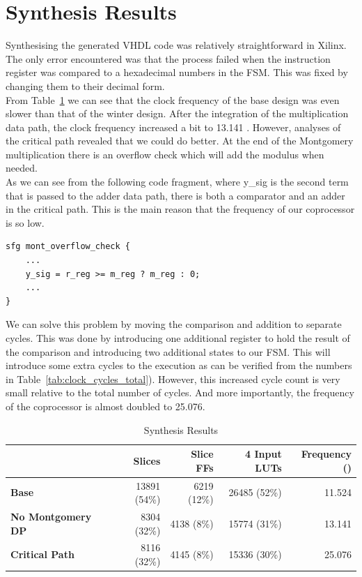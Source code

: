 \documentclass[a4paper]{article}
\begin{document}
\section{Synthesis Results}
\label{sec:synthesis_results}

Synthesising the generated VHDL code was relatively straightforward in Xilinx. The only error encountered was that the process failed when the instruction register was compared to a hexadecimal numbers in the FSM. This was fixed by changing them to their decimal form.\\

From Table~\ref{tab:synthesis_results} we can see that the clock frequency of the base design was even slower than that of the winter design. After the integration of the multiplication data path, the clock frequency increased a bit to 13.141 \mega\hertz. However, analyses of the critical path revealed that we could do better. At the end of the Montgomery multiplication there is an overflow check which will add the modulus when needed.\\

As we can see from the following code fragment, where y\_sig is the second term that is passed to the adder data path, there is both a comparator and an adder in the critical path. This is the main reason that the frequency of our coprocessor is so low.

\begin{lstlisting}
sfg mont_overflow_check {
    ...
    y_sig = r_reg >= m_reg ? m_reg : 0;
    ...
}
\end{lstlisting}

We can solve this problem by moving the comparison and addition to separate cycles. This was done by introducing one additional register to hold the result of the comparison and introducing two additional states to our FSM. This will introduce some extra cycles to the execution as can be verified from the numbers in Table~\ref{tab:clock_cycles_total}). However, this increased cycle count is very small relative to the total number of cycles. And more importantly, the frequency of the coprocessor is almost doubled to 25.076.\\

\begin{table}[H]
	\begin{center}	
		\begin{tabular}{l|r|r|r|r}
			& \textbf{Slices} & \textbf{Slice FFs} & \textbf{4 Input LUTs} & \textbf{Frequency} (\mega\hertz)\\\hline
        		\textbf{Base} & 13891 (54\%) & 6219 (12\%) & 26485 (52\%) & 11.524\\
             \textbf{No Montgomery DP} & 8304 (32\%) & 4138 (8\%) & 15774 (31\%) & 13.141\\
             \textbf{Critical Path} & 8116 (32\%) & 4145 (8\%) & 15336 (30\%) & 25.076
		\end{tabular}
	\end{center}
	\caption{Synthesis Results}
	\label{tab:synthesis_results}
\end{table}
\end{document}
